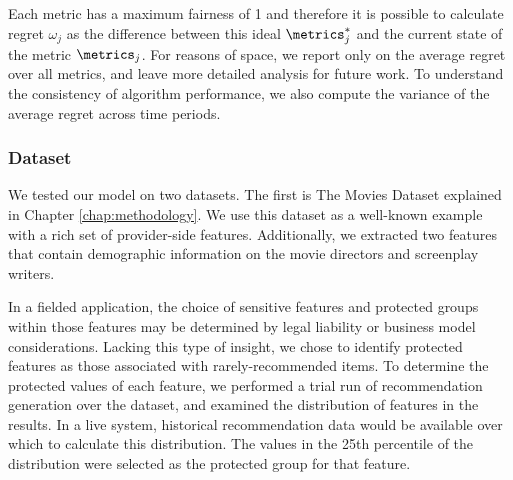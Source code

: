 Each metric has a maximum fairness of 1 and therefore it is possible to calculate regret $\omega_j$ as the difference between this ideal $\metrics_j^*$ and the current state of the metric $\metrics_j$. For reasons of space, we report only on the average regret over all metrics, and leave more detailed analysis for future work. To understand the consistency of algorithm performance, we also compute the variance of the average regret across time periods.

\subsubsection{Dataset}
We tested our model on two datasets. The first is The Movies Dataset explained in Chapter \ref{chap:methodology}. We use this dataset as a well-known example with a rich set of provider-side features. Additionally, we extracted two features that contain demographic information on the movie directors and screenplay writers.

In a fielded application, the choice of sensitive features and protected groups within those features may be determined by legal liability or business model considerations. Lacking this type of insight, we chose to identify protected features as those associated with rarely-recommended items. To determine the protected values of each feature, we performed a trial run of recommendation generation over the dataset, and examined the distribution of features in the results. In a live system, historical recommendation data would be available over which to calculate this distribution. The values in the 25th percentile of the distribution were selected as the protected group for that feature.


